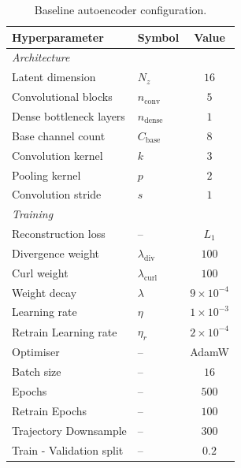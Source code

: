 \begin{table}[H]
    \centering
    
    \begin{tabular}{@{}llc@{}}
        \toprule
        Hyperparameter & Symbol & Value \\
        \midrule
        \multicolumn{3}{l}{\textit{Architecture}} \\
        Latent dimension          & $N_z$            & $16$ \\
        Convolutional blocks      & $n_\text{conv}$  & $5$  \\ %
        Dense bottleneck layers   & $n_\text{dense}$ & $1$  \\ %
        Base channel count        & $C_\text{base}$  & $8$  \\
        Convolution kernel        & $k$              & $3$  \\
        Pooling kernel            & $p$              & $2$  \\
        Convolution stride        & $s$              & $1$  \\
        \midrule
        \multicolumn{3}{l}{\textit{Training}} \\
        Reconstruction loss       & --                      & $L_1$ \\
        Divergence weight         & $\lambda_\text{div}$    & $100$ \\ %
        Curl weight               & $\lambda_\text{curl}$   & $100$ \\
        Weight decay              & $\lambda$               & $9\times10^{-4}$ \\
        Learning rate             & $\eta$                  & $1\times10^{-3}$ \\
        Retrain Learning rate     & $\eta_r$                & $2\times10^{-4}$ \\
        Optimiser                 & --                      & AdamW \\ %
        Batch size                & --                      & $16$  \\
        Epochs                    & --                      & $500$ \\
        Retrain Epochs            & --                      & $100$ \\
        Trajectory Downsample     & --                      & $300$ \\
        Train - Validation split  & --                      & $0.2$ \\
        \bottomrule
    \end{tabular}
    \caption{Baseline autoencoder configuration.}
    \label{tab: 4_ae_config}
\end{table}

